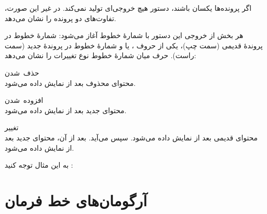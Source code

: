 \documentclass{utap}
\renewcommand{\labelitemi}{$\circ$}
\begin{document}
    اگر پرونده‌ها یکسان باشند، دستور  هیچ خروجی‌ای تولید نمی‌کند. در غیر این صورت، تفاوت‌های دو پرونده را نشان می‌دهد.

    هر بخش از خروجی این دستور با شمارهٔ خطوط آغاز می‌شود: شمارهٔ خطوط در پروندهٔ قدیمی (سمت چپ)، یکی از حروف ،  یا  و شمارهٔ خطوط در پروندهٔ جدید (سمت راست). حرف میان شمارهٔ خطوط نوع تغییرات را نشان می‌دهد:
    \begin{description}[leftmargin=3em,style=nextline,font=\labelitemi\quad\bfseries]
        \item[\lr{\texttt{d}}] حذف~شدن\\
        محتوای محذوف بعد از \lr{\lstinline[language=diff]{<}} نمایش داده می‌شود.
        \item[\lr{\texttt{a}}] افزوده~شدن\\
        محتوای جدید بعد از \lr{\lstinline[language=diff]{>}} نمایش داده می‌شود.
        \item[\lr{\texttt{c}}] تغییر\\
        محتوای قدیمی بعد از \lr{\lstinline[language=diff]{<}} نمایش داده می‌شود.
        سپس \lr{\lstinline[language=diff]{---}} می‌آید.
        بعد از آن، محتوای جدید بعد از \lr{\lstinline[language=diff]{>}} نمایش داده می‌شود.
    \end{description}

    به این مثال توجه کنید \cite{wiki-diff}:
    \begin{latin}%
    \centering
    \begin{minipage}[t]{0.28\textwidth}
    \end{minipage}%
    \begin{minipage}[t]{0.28\textwidth}
    \end{minipage}%
    \begin{minipage}[t]{0.28\textwidth}
    
    \end{minipage}
    \end{latin}    

    \section[آرگومان‌های خط فرمان]{آرگومان‌های خط فرمان\label{sec:commandline-args}}
\end{document}
